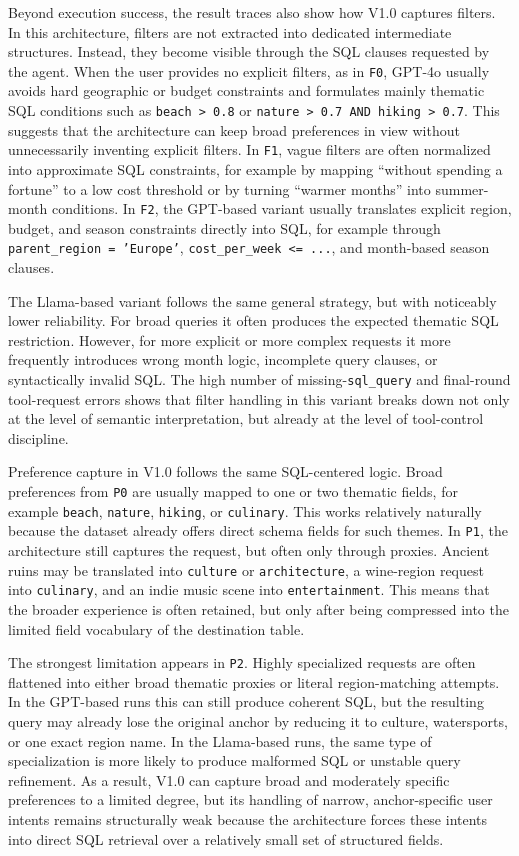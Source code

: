 Beyond execution success, the result traces also show how V1.0 captures filters. In this architecture, filters are not extracted into dedicated intermediate structures. Instead, they become visible through the SQL clauses requested by the agent. When the user provides no explicit filters, as in \texttt{F0}, GPT-4o usually avoids hard geographic or budget constraints and formulates mainly thematic SQL conditions such as \texttt{beach > 0.8} or \texttt{nature > 0.7 AND hiking > 0.7}. This suggests that the architecture can keep broad preferences in view without unnecessarily inventing explicit filters. In \texttt{F1}, vague filters are often normalized into approximate SQL constraints, for example by mapping ``without spending a fortune'' to a low cost threshold or by turning ``warmer months'' into summer-month conditions. In \texttt{F2}, the GPT-based variant usually translates explicit region, budget, and season constraints directly into SQL, for example through \texttt{parent\_region = 'Europe'}, \texttt{cost\_per\_week <= ...}, and month-based season clauses.

The Llama-based variant follows the same general strategy, but with noticeably lower reliability. For broad queries it often produces the expected thematic SQL restriction. However, for more explicit or more complex requests it more frequently introduces wrong month logic, incomplete query clauses, or syntactically invalid SQL. The high number of missing-\texttt{sql\_query} and final-round tool-request errors shows that filter handling in this variant breaks down not only at the level of semantic interpretation, but already at the level of tool-control discipline.

Preference capture in V1.0 follows the same SQL-centered logic. Broad preferences from \texttt{P0} are usually mapped to one or two thematic fields, for example \texttt{beach}, \texttt{nature}, \texttt{hiking}, or \texttt{culinary}. This works relatively naturally because the dataset already offers direct schema fields for such themes. In \texttt{P1}, the architecture still captures the request, but often only through proxies. Ancient ruins may be translated into \texttt{culture} or \texttt{architecture}, a wine-region request into \texttt{culinary}, and an indie music scene into \texttt{entertainment}. This means that the broader experience is often retained, but only after being compressed into the limited field vocabulary of the destination table.

The strongest limitation appears in \texttt{P2}. Highly specialized requests are often flattened into either broad thematic proxies or literal region-matching attempts. In the GPT-based runs this can still produce coherent SQL, but the resulting query may already lose the original anchor by reducing it to culture, watersports, or one exact region name. In the Llama-based runs, the same type of specialization is more likely to produce malformed SQL or unstable query refinement. As a result, V1.0 can capture broad and moderately specific preferences to a limited degree, but its handling of narrow, anchor-specific user intents remains structurally weak because the architecture forces these intents into direct SQL retrieval over a relatively small set of structured fields.

